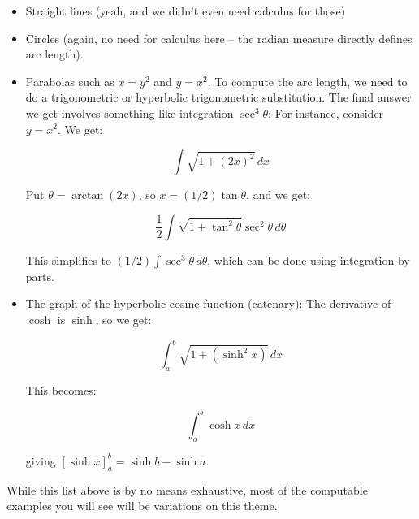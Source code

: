 \documentclass[10pt]{amsart}
\begin{document}
\begin{itemize}
\item Straight lines (yeah, and we didn't even need calculus for those)
\item Circles (again, no need for calculus here -- the radian measure
  directly defines arc length).
\item Parabolas such as $x = y^2$ and $y = x^2$. To compute the arc
  length, we need to do a trigonometric or hyperbolic trigonometric
  substitution. The final answer we get involves something like
  integration $\sec^3 \theta$: For instance, consider $y = x^2$. We get:

  $$\int \sqrt{1 + (2x)^2} \, dx$$

  Put $\theta = \arctan(2x)$, so $x = (1/2)\tan \theta$, and we get:

  $$\frac{1}{2} \int \sqrt{1 + \tan^2\theta} \sec^2 \theta \, d\theta$$

  This simplifies to $(1/2) \int \sec^3\theta \, d\theta$, which can
  be done using integration by parts.

\item The graph of the hyperbolic cosine function (catenary): The
  derivative of $\cosh$ is $\sinh$, so we get:

  $$\int_a^b \sqrt{1 + (\sinh^2x)} \, dx$$

  This becomes:

  $$\int_a^b \cosh x \, dx$$

  giving $[\sinh x]_a^b = \sinh b - \sinh a$.
\end{itemize}

While this list above is by no means exhaustive, most of the
computable examples you will see will be variations on this theme.
\end{document}
